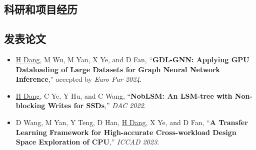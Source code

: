 \documentclass[a4paper,10pt]{ctexart} %
\begin{document}

\begin{keepsection}
\section{科研和项目经历}

\subsection{发表论文}
    \begin{itemize}
        \item \underline{H Dang}, M Wu, M Yan, X Ye, and D Fan, ``\textbf{GDL-GNN: Applying GPU Dataloading of Large Datasets for Graph Neural Network Inference},'' accepted by \textit{Euro-Par 2024}.
        \item \underline{H Dang}, C Ye, Y Hu, and C Wang, ``\textbf{NobLSM: An LSM-tree with Non-blocking Writes for SSDs},'' \textit{DAC 2022}.
        \item D Wang, M Yan, Y Teng, D Han, \underline{H Dang}, X Ye, and D Fan, ``\textbf{A Transfer Learning Framework for High-accurate Cross-workload Design Space Exploration of CPU},'' \textit{ICCAD 2023}.
    \end{itemize}
\end{keepsection}
\end{document}
